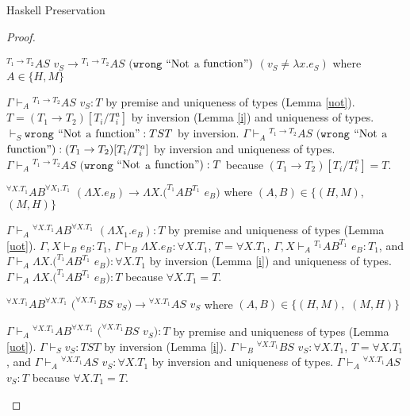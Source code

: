\begin{theorem}{Haskell Preservation}
\begin{proof}

\begin{case}
$^{T_{1}\rightarrow T_{2}}AS$ $v_{S}\rightarrow{^{T_{1}\rightarrow T_{2}}A}S$ $(\mathtt{wrong}$ $\mathrm{``Not}$ $\mathrm{a}$ $\mathrm{function"})$ $(v_{S}\neq\lambda x.e_{S})$ where $A\in\lbrace H,M\rbrace$

$\Gamma\vdash_{A}{^{T_{1}\rightarrow T_{2}}A}S$ $v_{S}:T$ by premise and uniqueness of types (Lemma \ref{uot}).  $T=(T_{1}\rightarrow T_{2})[T_{i}/T_{i}^{a}]$ by inversion (Lemma \ref{i}) and uniqueness of types.  $\vdash_{S}\mathtt{wrong}$ $\mathrm{``Not}$ $\mathrm{a}$ $\mathrm{function"}:TST$ by inversion.  $\Gamma\vdash_{A}{^{T_{1}\rightarrow T_{2}}A}S$ $(\mathtt{wrong}$ $\mathrm{``Not}$ $\mathrm{a}$ $\mathrm{function"}):(T_{1}\rightarrow T_{2})[T_{i}/T_{i}^{a}]$ by inversion and uniqueness of types.  $\Gamma\vdash_{A}{^{T_{1}\rightarrow T_{2}}A}S$ $(\mathtt{wrong}$ $\mathrm{``Not}$ $\mathrm{a}$ $\mathrm{function"}):T$ because $(T_{1}\rightarrow T_{2})[T_{i}/T_{i}^{a}]=T$.
\end{case}


\begin{case}
$^{\forall X.T_{1}}AB^{\forall X_{1}.T_{1}}$ $(\Lambda X.e_{B})\rightarrow\Lambda X.(^{T_{1}}AB^{T_{1}}$ $e_{B})$ where $(A,B)\in\lbrace(H,M),$ $(M,H)\rbrace$

$\Gamma\vdash_{A}{^{\forall X.T_{1}}A}B^{\forall X.T_{1}}$ $(\Lambda X_{1}.e_{B}):T$ by premise and uniqueness of types (Lemma \ref{uot}).  $\Gamma,X\vdash_{B}e_{B}:T_{1}$, $\Gamma\vdash_{B}\Lambda X.e_{B}:\forall X.T_{1}$, $T=\forall X.T_{1}$, $\Gamma,X\vdash_{A}{^{T_{1}}A}B^{T_{1}}$ $e_{B}:T_{1}$, and $\Gamma\vdash_{A}\Lambda X.(^{T_{1}}AB^{T_{1}}$ $e_{B}):\forall X.T_{1}$ by inversion (Lemma \ref{i}) and uniqueness of types.  $\Gamma\vdash_{A}\Lambda X.(^{T_{1}}AB^{T_{1}}$ $e_{B}):T$ because $\forall X.T_{1}=T$.
\end{case}


\begin{case}
$^{\forall X.T_{1}}AB^{\forall X.T_{1}}$ $(^{\forall X.T_{1}}BS$ $v_{S})\rightarrow{^{\forall X.T_{1}}A}S$ $v_{S}$ where $(A,B)\in\lbrace(H,M),$ $(M,H)\rbrace$

$\Gamma\vdash_{A}{^{\forall X.T_{1}}A}B^{\forall X.T_{1}}$ $(^{\forall X.T_{1}}BS$ $v_{S}):T$ by premise and uniqueness of types (Lemma \ref{uot}).  $\Gamma\vdash_{S}v_{S}:TST$ by inversion (Lemma \ref{i}).  $\Gamma\vdash_{B}{^{\forall X.T_{1}}B}S$ $v_{S}:\forall X.T_{1}$, $T=\forall X.T_{1}$, and $\Gamma\vdash_{A}{^{\forall X.T_{1}}A}S$ $v_{S}:\forall X.T_{1}$ by inversion and uniqueness of types.  $\Gamma\vdash_{A}{^{\forall X.T_{1}}A}S$ $v_{S}:T$ because $\forall X.T_{1}=T$.
\end{case}


\end{proof}
\end{theorem}
